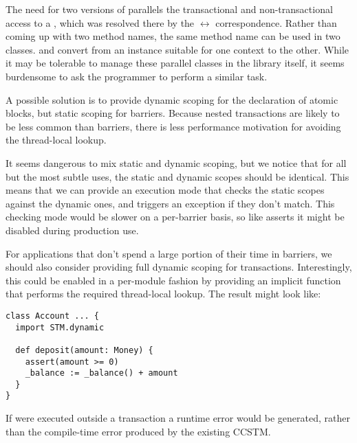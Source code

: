 The need for two versions of  parallels the transactional and
non-transactional access to a , which was resolved there by the
 $\leftrightarrow$  correspondence.  Rather than
coming up with two method names, the same method name can be used in
two classes.   and 
convert from an instance suitable for one context to the other.  While it
may be tolerable to manage these parallel classes in the library itself,
it seems burdensome to ask the programmer to perform a similar task.

A possible solution is to provide dynamic scoping for the declaration
of atomic blocks, but static scoping for barriers.  Because nested
transactions are likely to be less common than barriers, there is less
performance motivation for avoiding the thread-local lookup.

It seems dangerous to mix static and dynamic scoping, but we notice that
for all but the most subtle uses, the static and dynamic scopes should be
identical.  This means that we can provide an execution mode that checks
the
static scopes against the dynamic ones, and triggers an exception 
if they don't match.  This checking mode would be slower on a per-barrier
basis, so like asserts it might be disabled during production use.

For applications that don't spend a large portion of their time in barriers, we
should also consider providing full dynamic scoping for transactions.
Interestingly, this could be enabled in a per-module fashion by providing an
implicit function that performs the required thread-local lookup.  The result
might look like:
\lstset{numbers=none}
\begin{lstlisting}
class Account ... {
  import STM.dynamic

  def deposit(amount: Money) {
    assert(amount >= 0)
    _balance := _balance() + amount
  }
}
\end{lstlisting}
\lstset{numbers=left}
If  were executed outside a transaction a runtime error would be
generated, rather than the compile-time error produced by the existing CCSTM.

